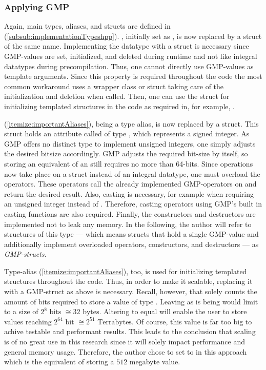 \subsubsection*{Applying GMP}\label{subsub:applyingGMP}
Again, main types, aliases, and structs are defined in  (\ref{subsub:implementationTypeshpp}).
, initially set as , is now replaced by a struct of the same name.
Implementing the datatype with a struct is necessary since GMP-values are set, initialized, and deleted during runtime and not like integral datatypes during precompilation.
Thus, one cannot directly use GMP-values as template arguments.
Since this property is required throughout the code the most common workaround uses a wrapper class or struct taking care of the initialization and deletion when called.
Then, one can use the struct for initializing templated structures in the code as required in, for example, .

 (\ref{itemize:importantAliases}), being a type alias, is now replaced by a struct.
This struct holds an attribute called  of type , which represents a signed integer.
As GMP offers no distinct type to implement unsigned integers, one simply adjusts the desired bitsize accordingly.
GMP adjusts the required bit-size by itself, so storing an equivalent of an  still requires no more than 64-bits.
Since operations now take place on a struct instead of an integral datatype, one must overload the operators.
These operators call the already implemented GMP-operators on  and return the desired result.
Also, casting is necessary, for example when requiring an unsigned integer instead of .
Therefore, casting operators using GMP's built in casting functions are also required.
Finally, the constructors and destructors are implemented not to leak any memory.
In the following, the author will refer to structures of this type — which means structs that hold a single GMP-value and additionally implement overloaded operators, constructors, and destructors — as \textit{GMP-structs}.

Type-alias  (\ref{itemize:importantAliases}), too, is used for initializing templated structures throughout the code.
Thus, in order to make it scalable, replacing it with a GMP-struct as above is necessary.
Recall, however, that  solely counts the amount of bits required to store a value of type .
Leaving  as is being  would limit  to a size of $2^8\text{ bits }\cong 32\text{ bytes}$.
Altering  to equal  will enable the user to store values reaching $2^{64} \text{ bit }\cong 2^{51}\text{ Terrabytes}$.
Of course, this value is far too big to achive testable and performant results.
This leads to the conclusion that scaling  is of no great use in this research since it will solely impact performance and general memory usage.
Therefore, the author chose to set  to  in this approach which is the equivalent of storing a $512$ megabyte value.

